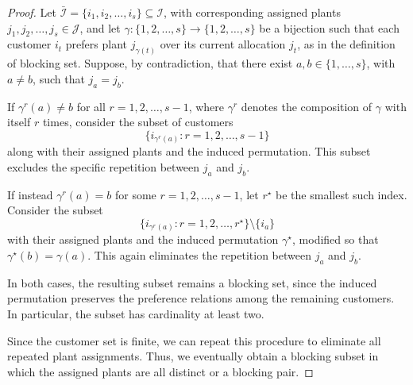 \documentclass[preprint,11pt,authoryear]{elsarticle}
\def\J{\mathcal{J}}
\def\I{\mathcal{I}}
\begin{document}
\begin{proof}
Let \( \bar{\I} = \{i_1, i_2, \dots, i_s\} \subseteq \I \), with corresponding assigned plants \( j_1, j_2, \dots, j_s \in \J \), and let \( \gamma : \{1, 2, \dots, s\} \to \{1, 2, \dots, s\} \) be a bijection such that each customer \( i_t \) prefers plant \( j_{\gamma(t)} \) over its current allocation \( j_t \), as in the definition of blocking set. Suppose, by contradiction, that there exist \( a, b \in \{1, \dots, s\} \), with \( a \ne b \), such that \( j_a = j_b \).

If \( \gamma^r(a) \ne b \) for all \( r = 1, 2, \dots, s-1 \), where \( \gamma^r \) denotes the composition of \( \gamma \) with itself \( r \) times, consider the subset of customers
\[
    \{i_{\gamma^r(a)} : r = 1, 2, \dots, s-1\}
\]
along with their assigned plants and the induced permutation. This subset excludes the specific repetition between \( j_a \) and \( j_b \).

If instead \( \gamma^r(a) = b \) for some \( r = 1, 2, \dots, s-1 \), let \( r^\star \) be the smallest such index. Consider the subset
\[
    \{i_{\gamma^r(a)} : r = 1, 2, \dots, r^\star\} \setminus \{i_a\}
\]
with their assigned plants and the induced permutation \( \gamma^\star \), modified so that \( \gamma^\star(b) = \gamma(a) \). This again eliminates the repetition between \( j_a \) and \( j_b \).

In both cases, the resulting subset remains a blocking set, since the induced permutation preserves the preference relations among the remaining customers. In particular, the subset has cardinality at least two.

Since the customer set is finite, we can repeat this procedure to eliminate all repeated plant assignments. Thus, we eventually obtain a blocking subset in which the assigned plants are all distinct or a blocking pair.
\end{proof}
 
\end{document}
